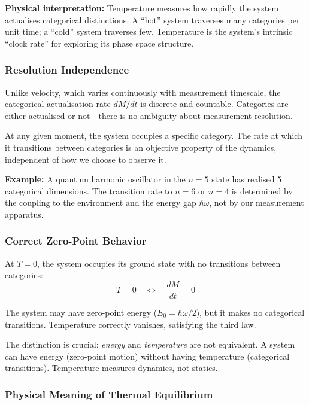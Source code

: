 \textbf{Physical interpretation:} Temperature measures how rapidly the system actualises categorical distinctions. A ``hot'' system traverses many categories per unit time; a ``cold'' system traverses few. Temperature is the system's intrinsic ``clock rate'' for exploring its phase space structure.

\subsubsection{Resolution Independence}

Unlike velocity, which varies continuously with measurement timescale, the categorical actualisation rate $dM/dt$ is discrete and countable. Categories are either actualised or not—there is no ambiguity about measurement resolution.

At any given moment, the system occupies a specific category. The rate at which it transitions between categories is an objective property of the dynamics, independent of how we choose to observe it.

\textbf{Example:} A quantum harmonic oscillator in the $n=5$ state has realised 5 categorical dimensions. The transition rate to $n=6$ or $n=4$ is determined by the coupling to the environment and the energy gap $\hbar\omega$, not by our measurement apparatus.

\subsubsection{Correct Zero-Point Behavior}

At $T = 0$, the system occupies its ground state with no transitions between categories:
\begin{equation}
T = 0 \quad \Leftrightarrow \quad \frac{dM}{dt} = 0
\end{equation}

The system may have zero-point energy ($E_0 = \hbar\omega/2$), but it makes no categorical transitions. Temperature correctly vanishes, satisfying the third law.

The distinction is crucial: \textit{energy} and \textit{temperature} are not equivalent. A system can have energy (zero-point motion) without having temperature (categorical transitions). Temperature measures dynamics, not statics.

\subsubsection{Physical Meaning of Thermal Equilibrium}


